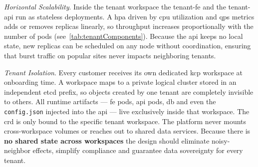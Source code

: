 \documentclass[11pt, a4paper, oneside, listof=totoc]{scrartcl}
\begin{document}
                \begin{enumerate}[label={[\arabic*]:},
                    ref=Challenge~\arabic*,
                    leftmargin=*,
                    itemsep=0.6\baselineskip]

                    \item\label{chal:architectureScalability}
                        \textit{Horizontal Scalability}.
                        Inside the tenant workspace the tenant-\gls{fe} and the tenant-\gls{api} run
                        as stateless deployments.
                        A \gls{hpa} driven by \gls{cpu} utilization and \gls{qps} metrics adds or
                        removes replicas linearly, so throughput increases proportionally with the
                        number of pods (see~\autoref{tab:tenantComponents}).
                        Because the \gls{api} keeps no local state, new replicas can be scheduled on
                        any node without coordination, ensuring that burst traffic on popular sites
                        never impacts neighboring tenants.

                    \item\label{chal:architectureIsolation}
                        \textit{Tenant Isolation}.
                        Every customer receives its own dedicated \gls{kcp} workspace at onboarding
                        time.
                        A workspace maps to a private logical cluster stored in an independent
                        \gls{etcd} prefix, so objects created by one tenant are completely invisible
                        to others.
                        All runtime artifacts --- \gls{fe} pods, \gls{api} pods, \gls{db} and even
                        the \texttt{config.json} injected into the \gls{api} --- live exclusively
                        inside that workspace.
                        The \gls{crd} is only bound to the specific tenant workspace.
                        The platform never mounts cross-workspace volumes or reaches out to shared
                        data services.
                        Because there is \textbf{no shared state across workspaces} the design
                        should eliminate noisy-neighbor effects, simplify compliance and guarantee
                        data sovereignty for every tenant.


\end{enumerate}
\end{document}
